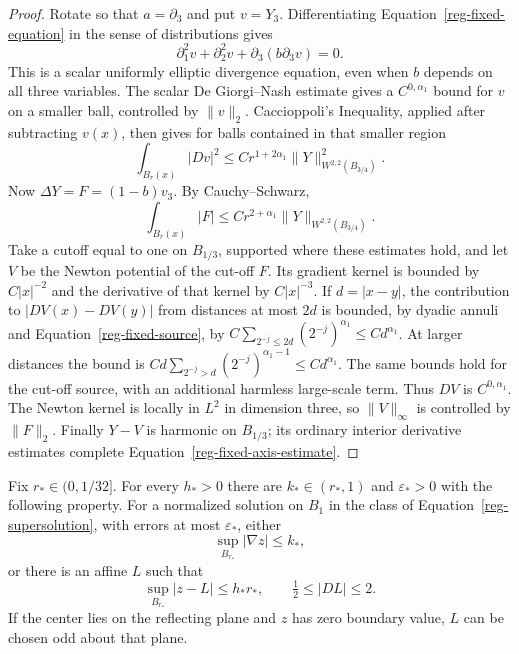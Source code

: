 \begin{proof}
Rotate so that $a=\partial_3$ and put $v=Y_3$. Differentiating
Equation~\eqref{reg-fixed-equation} in the sense of distributions
gives
\[
 \partial_1^2v+\partial_2^2v+\partial_3(b\partial_3v)=0.
\]
This is a scalar uniformly elliptic divergence equation, even when
$b$ depends on all three variables. The scalar De Giorgi--Nash
estimate gives a $C^{0,\alpha_1}$ bound for $v$ on a smaller ball,
controlled by $\|v\|_2$. Caccioppoli's Inequality, applied after
subtracting $v(x)$, then gives for balls contained in that smaller
region
\begin{equation}
 \int_{B_r(x)}|Dv|^2\le Cr^{1+2\alpha_1}
                \|Y\|_{W^{2,2}(B_{3/4})}^2.
 \label{reg-fixed-morrey}
\end{equation}
Now $\Delta Y=F=(1-b)v_3$. By Cauchy--Schwarz,
\begin{equation}
 \int_{B_r(x)}|F|\le Cr^{2+\alpha_1}
                \|Y\|_{W^{2,2}(B_{3/4})}.
 \label{reg-fixed-source}
\end{equation}
Take a cutoff equal to one on $B_{1/3}$, supported where these
estimates hold, and let $V$ be the Newton potential of the cut-off
$F$. Its gradient kernel is bounded by $C|x|^{-2}$ and the derivative
of that kernel by $C|x|^{-3}$. If $d=|x-y|$, the contribution to
$|DV(x)-DV(y)|$ from distances at most $2d$ is bounded, by dyadic
annuli and Equation~\eqref{reg-fixed-source}, by
$C\sum_{2^{-j}\le 2d}(2^{-j})^{\alpha_1}\le Cd^{\alpha_1}$.
At larger distances the bound is
$Cd\sum_{2^{-j}>d}(2^{-j})^{\alpha_1-1}\le Cd^{\alpha_1}$.
The same bounds hold for the cut-off source, with an additional
harmless large-scale term. Thus $DV$ is $C^{0,\alpha_1}$.
The Newton kernel is locally in $L^2$ in dimension three, so
$\|V\|_\infty$ is controlled by $\|F\|_2$. Finally $Y-V$ is
harmonic on $B_{1/3}$; its ordinary interior derivative estimates
complete Equation~\eqref{reg-fixed-axis-estimate}.
\end{proof}

\begin{lemma}
\label{reg-dichotomy}
Fix $r_*\in(0,1/32]$. For every $h_*>0$ there are
$k_*\in(r_*,1)$ and $\varepsilon_*>0$ with the following property.
For a normalized solution on $B_1$ in the class of
Equation~\eqref{reg-supersolution}, with errors at most
$\varepsilon_*$, either
\begin{equation}
 \sup_{B_{r_*}}|\nabla z|\le k_* ,
 \label{reg-drop}
\end{equation}
or there is an affine $L$ such that
\begin{equation}
 \sup_{B_{r_*}}|z-L|\le h_*r_* ,
 \qquad \tfrac12\le |DL|\le2.
 \label{reg-affine-alternative}
\end{equation}
If the center lies on the reflecting plane and $z$ has zero boundary
value, $L$ can be chosen odd about that plane.
\end{lemma}

